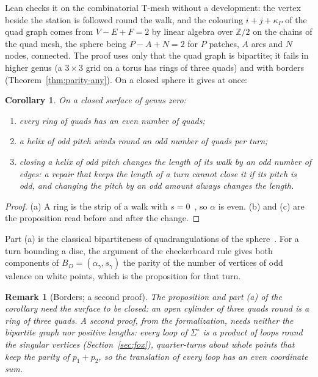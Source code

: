 \documentclass[11pt,a4paper]{article}
\newtheorem{corollary}{Corollary}
\newtheorem{remark}{Remark}
\newcommand{\Z}{\mathbb{Z}}
\newcommand{\shift}{s}
\newcommand{\lean}[1]{\texttt{\detokenize{#1}}}
\newenvironment{evidence}[3][]{}{}
\begin{document}
Lean checks it on the combinatorial T-mesh without a development: the vertex
beside the station is followed round the walk, and the colouring $i + j +
\kappa_P$ of the quad graph comes from $V - E + F = 2$ by linear algebra over
$\Z/2$ on the chains of the quad mesh, the sphere being $P - A + N = 2$ for
$P$ patches, $A$ arcs and $N$ nodes, connected. The proof uses only that
the quad graph is bipartite; it fails in higher genus
(a $3 \times 3$ grid on a torus has rings of three quads) and with borders
(Theorem~\ref{thm:parity-any}). On a closed sphere it gives at once:

\begin{evidence}{core}{\lean{ring_even}, \lean{odd_pitch_odd_length}, \lean{repair_keeps_length_cannot_close}, \lean{odd_change_of_pitch_changes_length}; assumed: as the proposition above}
\begin{corollary}\label{cor:parity}
On a closed surface of genus zero:
\begin{enumerate}
\item[(a)] every ring of quads has an even number of quads;
\item[(b)] a helix of odd pitch winds round an odd number of quads per turn;
\item[(c)] closing a helix of odd pitch changes the length of its walk by an
  odd number of edges: a repair that keeps the length of a turn cannot close it
  if its pitch is odd, and changing the pitch by an odd amount always changes
  the length.
\end{enumerate}
\end{corollary}
\end{evidence}

\begin{proof}
(a) A ring is the strip of a walk with $\shift =
0$~\cite[Prop.~2]{gardent2026loops}, so $\alpha$ is even. (b) and (c) are the
proposition read before and after the change.
\end{proof}

Part (a) is the classical bipartiteness of quadrangulations of the
sphere~\cite[Lemma~3.1]{kaiser2015colouring}. For a turn bounding a disc, the
argument of the checkerboard rule gives both components of $B_D =
(\alpha_\gamma, \shift_\gamma)$ the parity of the number of vertices of odd
valence on white points, which is the proposition for that turn.

\begin{evidence}{core}{\lean{colour_hol_trans}; assumed: the turn is a word in the loops round the cone points}
\begin{remark}[Borders; a second proof]\label{rem:borders}
The proposition and part (a) of the corollary need the surface to be closed:
an open cylinder of three quads round is a ring of three quads. A second proof,
from the formalization, needs neither the bipartite graph nor positive
lengths: every loop of $\Sigma^\circ$ is a product of loops round the
singular vertices (Section~\ref{sec:fox}), quarter-turns about whole points
that keep the parity of $p_1 + p_2$, so the translation of every loop has an
even coordinate sum.
\end{remark}
\end{evidence}
\end{document}
